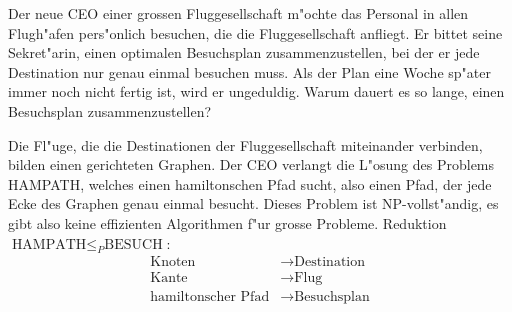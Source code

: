 Der neue CEO einer grossen Fluggesellschaft m"ochte das Personal in allen
Flugh"afen pers"onlich besuchen, die die Fluggesellschaft anfliegt.
Er bittet seine Sekret"arin, einen optimalen Besuchsplan zusammenzustellen,
bei der er jede Destination nur genau einmal besuchen muss.
Als der Plan eine Woche sp"ater immer noch nicht fertig ist, wird er
ungeduldig.
Warum dauert es so lange, einen Besuchsplan zusammenzustellen?

\begin{loesung}
Die Fl"uge, die die Destinationen der Fluggesellschaft miteinander
verbinden, bilden einen gerichteten Graphen.
Der CEO verlangt die L"osung des Problems HAMPATH, welches einen
hamiltonschen Pfad sucht, also einen Pfad, der jede Ecke des Graphen
genau einmal besucht.
Dieses Problem ist NP-vollst"andig, es gibt also keine effizienten
Algorithmen f"ur grosse Probleme.
Reduktion $\text{HAMPATH}\le_P\text{BESUCH}$:
\begin{align*}
\text{Knoten}    & \to \text{Destination}\\
\text{Kante}     & \to \text{Flug} \\
\text{hamiltonscher Pfad}&\to\text{Besuchsplan}
\end{align*}
\end{loesung}

